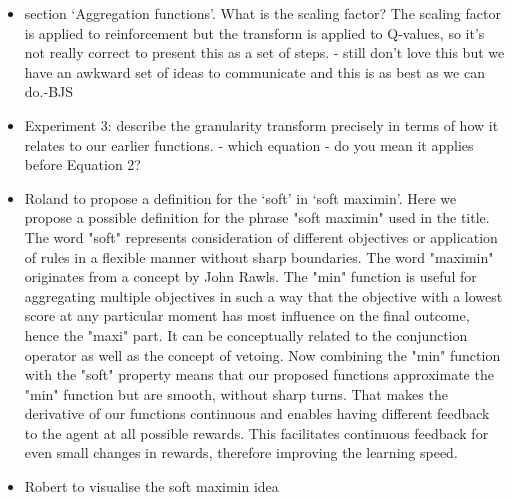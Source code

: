 \begin{itemize}
    \item section `Aggregation functions'. What is the scaling factor? The scaling factor is applied to reinforcement but the transform is applied to Q-values, so it's not really correct to present this as a set of steps. - still don't love this but we have an awkward set of ideas to communicate and this is as best as we can do.-BJS
    \item Experiment 3: describe the granularity transform precisely in terms of how it relates to our earlier functions. - which equation - do you mean it applies before Equation 2?
    \item Roland to propose a definition for the `soft' in `soft maximin'.
    Here we propose a possible definition for the phrase "soft maximin" used in the title. The word "soft" represents consideration of different objectives or application of rules in a flexible manner without sharp boundaries. The word "maximin" originates from a concept by John Rawls. The "min" function is useful for aggregating multiple objectives in such a way that the objective with a lowest score at any particular moment has most influence on the final outcome, hence the "maxi" part. It can be conceptually related to the conjunction operator as well as the concept of vetoing. Now combining the "min" function with the "soft" property means that our proposed functions approximate the "min" function but are smooth, without sharp turns. That makes the derivative of our functions continuous and enables having different feedback to the agent at all possible rewards. This facilitates continuous feedback for even small changes in rewards, therefore improving the learning speed.
    \item Robert to visualise the soft maximin idea
\end{itemize}
    
 